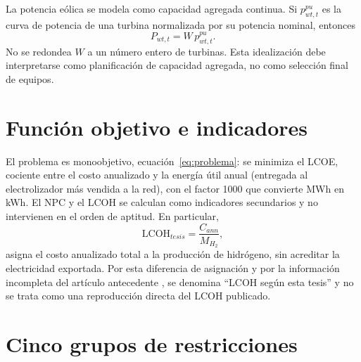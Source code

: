 La potencia eólica se modela como capacidad agregada continua. Si $p_{wt,t}^{pu}$ es la curva de potencia de una turbina normalizada por su potencia nominal, entonces
\begin{equation}
P_{wt,t}=W\,p_{wt,t}^{pu}.
\end{equation}
No se redondea $W$ a un número entero de turbinas. Esta idealización debe interpretarse como planificación de capacidad agregada, no como selección final de equipos.

\section{Función objetivo e indicadores}

El problema es monoobjetivo, ecuación~\eqref{eq:problema}: se minimiza el LCOE, cociente entre el costo anualizado y la energía útil anual (entregada al electrolizador más vendida a la red), con el factor 1000 que convierte MWh en kWh. El NPC y el LCOH se calculan como indicadores secundarios y no intervienen en el orden de aptitud. En particular,
\begin{equation}
\mathrm{LCOH}_{tesis}=\frac{C_{ann}}{M_{H_2}},
\end{equation}
asigna el costo anualizado total a la producción de hidrógeno, sin acreditar la electricidad exportada. Por esta diferencia de asignación y por la información incompleta del artículo antecedente \cite{Li2023TechnoEconomic}, se denomina ``LCOH según esta tesis'' y no se trata como una reproducción directa del LCOH publicado.

\section{Cinco grupos de restricciones}

